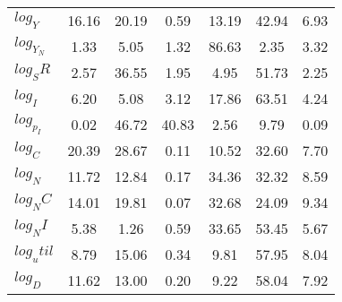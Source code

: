 \begin{center}
\begin{longtable}{lcccccc}
$log_Y     $	 & 	       16.16	 & 	       20.19	 & 	        0.59	 & 	       13.19	 & 	       42.94	 & 	        6.93 \\ 
$log_Y_N   $	 & 	        1.33	 & 	        5.05	 & 	        1.32	 & 	       86.63	 & 	        2.35	 & 	        3.32 \\ 
$log_SR    $	 & 	        2.57	 & 	       36.55	 & 	        1.95	 & 	        4.95	 & 	       51.73	 & 	        2.25 \\ 
$log_I     $	 & 	        6.20	 & 	        5.08	 & 	        3.12	 & 	       17.86	 & 	       63.51	 & 	        4.24 \\ 
$log_p_I   $	 & 	        0.02	 & 	       46.72	 & 	       40.83	 & 	        2.56	 & 	        9.79	 & 	        0.09 \\ 
$log_C     $	 & 	       20.39	 & 	       28.67	 & 	        0.11	 & 	       10.52	 & 	       32.60	 & 	        7.70 \\ 
$log_N     $	 & 	       11.72	 & 	       12.84	 & 	        0.17	 & 	       34.36	 & 	       32.32	 & 	        8.59 \\ 
$log_NC    $	 & 	       14.01	 & 	       19.81	 & 	        0.07	 & 	       32.68	 & 	       24.09	 & 	        9.34 \\ 
$log_NI    $	 & 	        5.38	 & 	        1.26	 & 	        0.59	 & 	       33.65	 & 	       53.45	 & 	        5.67 \\ 
$log_util  $	 & 	        8.79	 & 	       15.06	 & 	        0.34	 & 	        9.81	 & 	       57.95	 & 	        8.04 \\ 
$log_D     $	 & 	       11.62	 & 	       13.00	 & 	        0.20	 & 	        9.22	 & 	       58.04	 & 	        7.92 \\ 
\end{longtable}
 \end{center}
